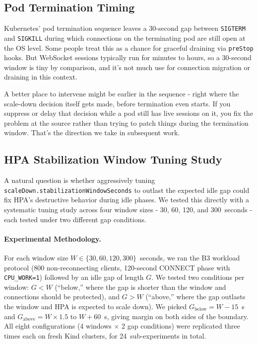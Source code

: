 \documentclass[twocolumn]{svjour3}
\begin{document}
\subsection{Pod Termination Timing}

Kubernetes' pod termination sequence leaves a 30-second gap between
\texttt{SIGTERM} and \texttt{SIGKILL} during which connections on the terminating
pod are still open at the OS level. Some people treat this as a chance for
graceful draining via \texttt{preStop} hooks. But WebSocket sessions typically run
for minutes to hours, so a 30-second window is tiny by comparison, and it's not
much use for connection migration or draining in this context.

A better place to intervene might be earlier in the sequence - right where the
scale-down decision itself gets made, before termination even starts. If you
suppress or delay that decision while a pod still has live sessions on it, you fix
the problem at the source rather than trying to patch things during the
termination window. That's the direction we take in subsequent work.

\subsection{HPA Stabilization Window Tuning Study}
\label{sec:tuning_study}

A natural question is whether aggressively tuning
\texttt{scaleDown.stabilizationWindowSeconds} to outlast the expected idle gap
could fix HPA's destructive behavior during idle phases. We tested this directly
with a systematic tuning study across four window sizes - 30, 60, 120, and
300~seconds - each tested under two different gap conditions.

\paragraph{Experimental Methodology.}
For each window size $W \in \{30, 60, 120, 300\}$~seconds, we ran the B3 workload
protocol (800 non-reconnecting clients, 120-second CONNECT phase with
\texttt{CPU\_WORK=1}) followed by an idle gap of length $G$. We tested two
conditions per window: $G < W$ (``below,'' where the gap is shorter than the
window and connections should be protected), and $G > W$ (``above,'' where the gap
outlasts the window and HPA is expected to scale down). We picked
$G_{\text{below}} = W - 15$~s and $G_{\text{above}} = W \times 1.5$ to $W + 60$~s,
giving margin on both sides of the boundary. All eight configurations (4 windows
$\times$ 2 gap conditions) were replicated three times each on fresh Kind
clusters, for 24~sub-experiments in total.
\end{document}
